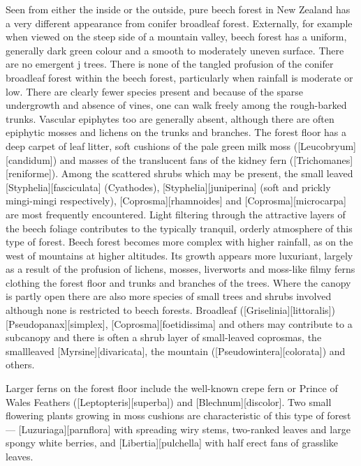 Seen from either the inside or the outside, pure beech forest in New Zealand has a very different appearance from conifer broadleaf forest.
Externally, for example when viewed on the steep side of a mountain valley, beech forest has a uniform, generally dark green colour and a smooth to moderately uneven surface.
There are no emergent j trees.
There is none of the tangled profusion of the conifer broadleaf forest within the beech forest, particularly when rainfall is moderate or low.
There are clearly fewer species present and because of the sparse undergrowth and absence of vines, one can walk freely among the rough-barked trunks.
Vascular epiphytes too are generally absent, although there are often epiphytic mosses and lichens on the trunks and branches.
The forest floor has a deep carpet of leaf litter, soft cushions of the pale green milk moss ([Leucobryum][candidum]) and masses of the translucent fans of the kidney fern ([Trichomanes][reniforme]).
Among the scattered shrubs which may be present, the small leaved [Styphelia][fasciculata] (Cyathodes), [Styphelia][juniperina] (soft and prickly mingi-mingi respectively), [Coprosma][rhamnoides] and [Coprosma][microcarpa] are most frequently encountered.
Light filtering through the attractive layers of the beech foliage contributes to the typically tranquil, orderly atmosphere of this type of forest.
Beech forest becomes more complex with higher rainfall, as on the west of mountains at higher altitudes.
Its growth appears more luxuriant, largely as a result of the profusion of lichens, mosses, liverworts and moss-like filmy ferns clothing the forest floor and trunks and branches of the trees.
Where the canopy is partly open there are also more species of small trees and shrubs involved although none is restricted to beech forests.
Broadleaf ([Griselinia][littoralis])[Pseudopanax][simplex],  [Coprosma][foetidissima] and others may contribute to a subcanopy and there is often a shrub layer of small-leaved coprosmas, the smallleaved [Myrsine][divaricata], the mountain  ([Pseudowintera][colorata]) and others.

Larger ferns on the forest floor include the well-known crepe fern or Prince of Wales Feathers ([Leptopteris][superba]) and [Blechnum][discolor].
Two small flowering plants growing in moss cushions are characteristic of this type of forest --- [Luzuriaga][parnflora] with spreading wiry stems, two-ranked leaves and large spongy white berries, and [Libertia][pulchella] with half erect fans of grasslike leaves.

